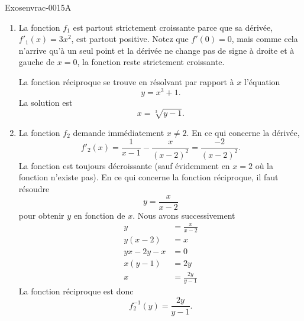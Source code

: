 \begin{corrige}{Exosenvrac-0015A}

    \begin{enumerate}
        \item
            La fonction \( f_1\) est partout strictement croissante parce que sa dérivée, \( f'_1(x)=3x^2\), est partout positive. Notez que \( f'(0)=0\), mais comme cela n'arrive qu'\`a un seul point et la d\'eriv\'ee ne change pas de signe \`a droite et \`a gauche de $x=0$,  la fonction reste strictement croissante.
            
            La fonction réciproque se trouve en résolvant par rapport à \( x\) l'équation
            \begin{equation}
                y=x^3+1.
            \end{equation}
            La solution est
            \begin{equation}
                x=\sqrt[3]{y-1}.
            \end{equation}
        \item
            La fonction \( f_2\) demande immédiatement \( x\neq 2\). En ce qui concerne la dérivée,
            \begin{equation}
                f'_2(x)=\frac{1}{ x-1 }-\frac{ x }{ (x-2)^2 }=\frac{ -2 }{ (x-2)^2 }.
            \end{equation}
            La fonction est toujours décroissante (sauf évidemment en \( x=2\) où la fonction n'existe pas).
            En ce qui concerne la fonction réciproque, il faut résoudre
            \begin{equation}
                y=\frac{ x }{ x-2 }
            \end{equation}
            pour obtenir \( y\) en fonction de \( x\). Nous avons successivement
            \begin{subequations}
                \begin{align}
                    y&=\frac{ x }{ x-2 }\\
                    y(x-2)&=x\\
                    yx-2y-x&=0\\
                    x(y-1)&=2y\\
                    x&=\frac{ 2y }{ y-1 }
                \end{align}
            \end{subequations}
            La fonction réciproque est donc
            \begin{equation}
                f_2^{-1}(y)=\frac{ 2y }{ y-1 }.
            \end{equation}
    \end{enumerate}

\end{corrige}
